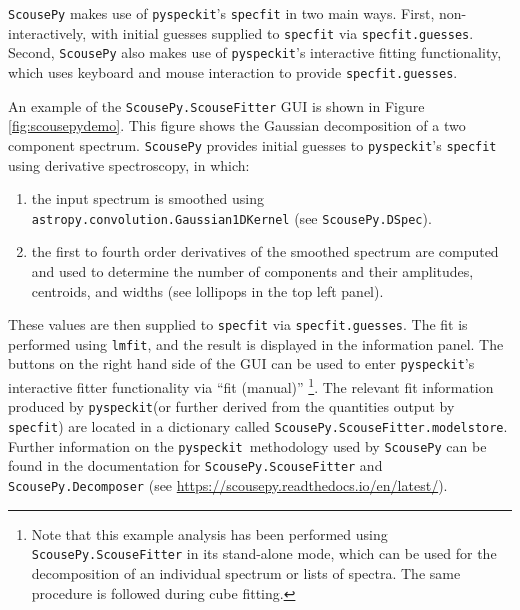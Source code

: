 \documentclass[twocolumn]{aastex63}
\newcommand{\pyspeckit}{\texttt{pyspeckit}\xspace}
\begin{document}
\texttt{ScousePy} makes use of \pyspeckit's \texttt{specfit} in two main ways.
First, non-interactively, with initial guesses supplied to \texttt{specfit} via \texttt{specfit.guesses}.
Second, \texttt{ScousePy} also makes use of \pyspeckit's interactive fitting functionality, which uses keyboard and mouse interaction to provide \texttt{specfit.guesses}.

An example of the \texttt{ScousePy.ScouseFitter} GUI is shown in Figure \ref{fig:scousepydemo}. This figure shows the Gaussian decomposition of a two component spectrum. \texttt{ScousePy} provides initial guesses to \pyspeckit's \texttt{specfit} using derivative spectroscopy, in which:
\begin{enumerate}  
\item the input spectrum is smoothed using \texttt{astropy.convolution.Gaussian1DKernel} (see \texttt{ScousePy.DSpec}).
\item the first to fourth order derivatives of the smoothed spectrum are computed and used to determine the number of components and their amplitudes, centroids, and widths (see lollipops in the top left panel). 
\end{enumerate}
These values are then supplied to \texttt{specfit} via \texttt{specfit.guesses}. The fit is performed using \texttt{lmfit}, and the result is displayed in the information panel. The buttons on the right hand side of the GUI can be used to enter \pyspeckit's interactive fitter functionality via ``fit (manual)'' \footnote{Note that this example analysis has been performed using \texttt{ScousePy.ScouseFitter} in its stand-alone mode, which can be used for the decomposition of an individual spectrum or lists of spectra. The same procedure is followed during cube fitting.}. The relevant fit information produced by \pyspeckit (or further derived from the quantities output by \texttt{specfit}) are located in a dictionary called \texttt{ScousePy.ScouseFitter.modelstore}. Further information on the \pyspeckit \ methodology used by \texttt{ScousePy} can be found in the documentation for \texttt{ScousePy.ScouseFitter} and \texttt{ScousePy.Decomposer} (see \url{https://scousepy.readthedocs.io/en/latest/}). 
\end{document}
